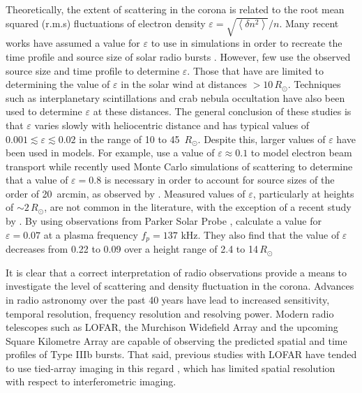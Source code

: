 Theoretically, the extent of scattering in the corona is related to the root mean squared (r.m.s) fluctuations of electron density $\varepsilon = \sqrt{\left< \delta n^2 \right>}/n$. Many recent works have assumed a value for $\varepsilon$ to use in simulations in order to recreate the time profile and source size of solar radio bursts \citep[e.g.][]{Krupar2018, Kontar2019}. However, few use the observed source size and time profile to determine $\varepsilon$. Those that have are limited to determining the value of $\varepsilon$ in the solar wind at distances $> 10 \, R_\odot$. Techniques such as interplanetary scintillations \citep[e.g.][]{Bisoi2014} and crab nebula occultation \citep{SasikumarRaja2016} have also been used to determine $\varepsilon$ at these distances. The general conclusion of these studies is that $\varepsilon$ varies slowly with heliocentric distance and has typical values of $0.001 \lesssim \varepsilon \lesssim 0.02$ in the range of 10 to 45 $\, R_\odot$. Despite this, larger values of $\varepsilon$ have been used in models. For example, \cite{Reid2010} use a value of $\varepsilon \approx 0.1$ to model electron beam transport while \cite{Kontar2019} recently used Monte Carlo simulations of scattering to determine that a value of $\varepsilon = 0.8$ is necessary in order to account for source sizes of the order of 20~arcmin, as observed by \cite{Kontar2017}. Measured values of $\varepsilon$, particularly at heights of ${\sim} 2 \, R_\odot$, are not common in the literature, with the exception of a recent study by \cite{Krupar2020}. By using observations from Parker Solar Probe \citep[PSP,][]{Fox2016}, \cite{Krupar2020} calculate a value for $\varepsilon = 0.07$ at a plasma frequency $f_p = 137$ kHz. They also find that the value of $\varepsilon$ decreases from 0.22 to 0.09 over a height range of 2.4 to 14$\, R_\odot$

It is clear that a correct interpretation of radio observations provide a means to investigate the level of scattering and density fluctuation in the corona. Advances in radio astronomy over the past 40 years have lead to increased sensitivity, temporal resolution, frequency resolution and resolving power. Modern radio telescopes such as LOFAR, the Murchison Widefield Array \citep[MWA;][]{Lonsdale2009} and the upcoming Square Kilometre Array \citep[SKA;][]{Dewdney2009} are capable of observing the predicted spatial and time profiles of Type IIIb bursts. That said, previous studies with LOFAR have tended to use tied-array imaging in this regard \citep{Kontar2017}, which has limited spatial resolution with respect to interferometric imaging.

